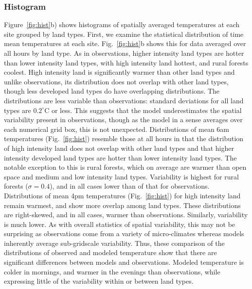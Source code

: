 \documentclass[draft,linenumbers]{agujournal}
\begin{document}
\subsubsection{Histogram}
Figure~\ref{fig:hist}b) shows histograms of spatially averaged temperatures at each site grouped by land types.
First, we examine the statistical distribution of time mean temperatures at each site. Fig.~\ref{fig:hist}b shows this for data averaged over all hours by land type. As in observations, higher intensity land types are hotter than lower intensity land types, with high intensity land hottest, and rural forests coolest. High intensity land is significantly warmer than other land types and unlike observations, its distribution does not overlap with other land types, though less developed land types do have overlapping distributions. The distributions are less variable than observations: standard deviations for all land types are $0.2^\circ$C or less. This suggests that the model underestimates the spatial variability present in observations, though as the model in a sense averages over each numerical grid box, this is not unexpected. 
Distributions of mean 6am temperatures (Fig.~\ref{fig:hist}) resemble those at all hours in that the distribution of high intensity land does not overlap with other land types and that higher intensity developed land types are hotter than lower intensity land types. The notable exception to this is rural forests, which on average are warmer than open space and medium and low intensity land types. Variability is highest for rural forests ($\sigma = 0.4$), and in all cases lower than of that for observations. Distributions of mean 4pm temperatures (Fig.~\ref{fig:hist}) for high intensity land remain warmest, and show more overlap among land types. These distributions are right-skewed, and in all cases, warmer than observations. Similarly, variability is much lower. As with overall statistics of spatial variability, this may not be surprising as observations come from a variety of micro-climates whereas models inherently average sub-gridscale variability. Thus, these comparison of the distributions of observed and modeled temperature show that there are significant differences between models and observations. Modeled temperature is colder in mornings, and warmer in the evenings than observations, while expressing little of the variability within or between land types. 
\end{document}
